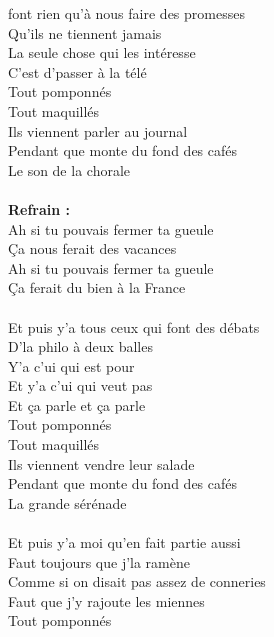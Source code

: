 
 font rien qu'à nous faire des promesses
\\Qu'ils ne tiennent jamais
\\La seule chose qui les intéresse
\\C'est d'passer à la télé
\\Tout pomponnés
\\Tout maquillés
\\Ils viennent parler au journal
\\Pendant que monte du fond des cafés
\\Le son de la chorale
\\\\\textbf{Refrain :}
\\Ah si tu pouvais fermer ta gueule
\\Ça nous ferait des vacances
\\Ah si tu pouvais fermer ta gueule
\\Ça ferait du bien à la France
\\\\Et puis y'a tous ceux qui font des débats
\\D'la philo à deux balles
\\Y'a c'ui qui est pour
\\Et y'a c'ui qui veut pas
\\Et ça parle et ça parle
\\Tout pomponnés
\\Tout maquillés
\\Ils viennent vendre leur salade
\\Pendant que monte du fond des cafés
\\La grande sérénade
\\\\Et puis y'a moi qu'en fait partie aussi
\\Faut toujours que j'la ramène
\\Comme si on disait pas assez de conneries
\\Faut que j'y rajoute les miennes
\\Tout pomponnés
